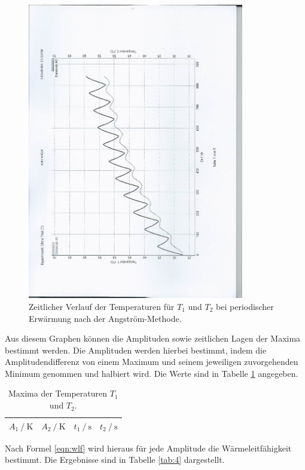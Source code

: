 \begin{figure}[H]
  \centering
  \includegraphics[height=13cm, angle=270]{scan-3.jpg}
  \caption{Zeitlicher Verlauf der Temperaturen für $T_1$ und $T_2$ bei periodischer Erwärmung nach der Angström-Methode.}
  \label{fig:5}
\end{figure}

Aus diesem Graphen können die Amplituden sowie zeitlichen Lagen der Maxima bestimmt werden.
Die Amplituden werden hierbei bestimmt, indem die Amplitudendifferenz von einem Maximum und seinem jeweiligen zuvorgehenden Minimum genommen und halbiert wird.
Die Werte sind in Tabelle \ref{tab:3} angegeben.

\begin{table}
  \centering
  \caption{Maxima der Temperaturen $T_1$ und $T_2$.}
  \label{tab:3}
  \begin{tabular}{c c c c}
    \toprule
    {$A_1 \:/\: \si{\kelvin}$} & {$A_2 \:/\: \si{\kelvin}$}  & {$t_1 \:/\: \si{\second}$}  & {$t_2 \:/\: \si{\second}$}\\
    \midrule
    
    \bottomrule
  \end{tabular}
\end{table}

Nach Formel \eqref{eqn:wlf} wird hieraus für jede Amplitude die Wärmeleitfähigkeit bestimmt.
Die Ergebnisse sind in Tabelle \ref{tab:4} dargestellt.

